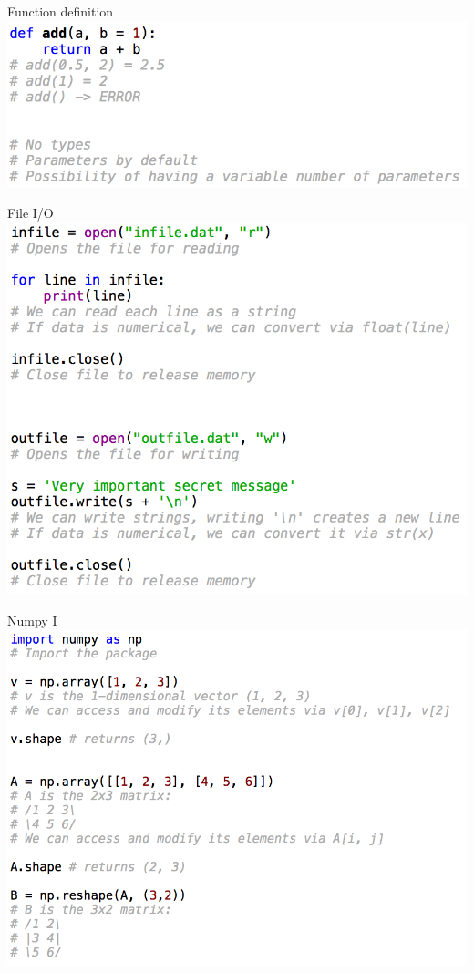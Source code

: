 \documentclass[11pt,unknownkeysallowed,usenames,dvipsnames]{beamer}
\begin{document}
%    
\begin{frame}{Function definition}
    \includegraphics[width=\linewidth]{code-functions}
\end{frame}
   

\begin{frame}{File I/O}
	\includegraphics[width=0.8\linewidth]{code-fileio}
\end{frame}


\begin{frame}{Numpy I}
	\includegraphics[width=0.9\linewidth]{code-numpy1}
\end{frame}
\end{document}
